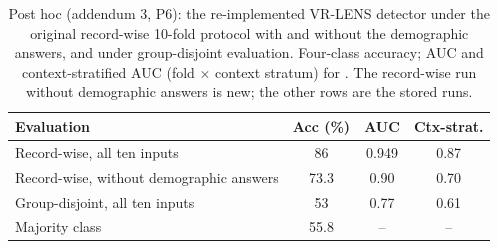 \begin{table}[ht]
\centering
\footnotesize
\caption{Post hoc (addendum 3, P6): the re-implemented VR-LENS detector under the original record-wise 10-fold protocol with and without the  demographic answers, and under group-disjoint evaluation. Four-class accuracy; AUC and context-stratified AUC (fold $\times$ context stratum) for \sevtwo{}. The record-wise run without demographic answers is new; the other rows are the stored runs.}
\label{tab:a3_vrlens}
\setlength{\tabcolsep}{3pt}
\begin{tabular}{@{}lccc@{}}
\toprule
Evaluation & Acc (\%) & AUC & Ctx-strat. \\
\midrule
Record-wise, all ten inputs & 86 & 0.949 & 0.87 \\
Record-wise, without demographic answers & 73.3 & 0.90 & 0.70 \\
Group-disjoint, all ten inputs & 53 & 0.77 & 0.61 \\
Majority class & 55.8 & -- & -- \\
\bottomrule
\end{tabular}
\end{table}

